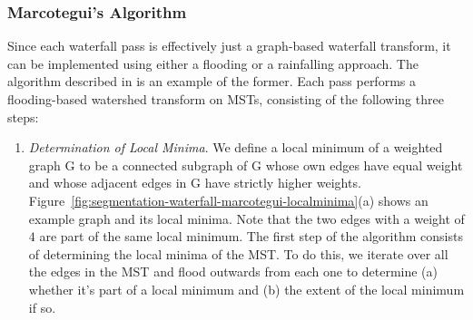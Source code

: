 \subsubsection{Marcotegui's Algorithm}

Since each waterfall pass is effectively just a graph-based waterfall transform, it can be implemented using either a flooding or a rainfalling approach. The algorithm described in \cite{marcotegui05} is an example of the former. Each pass performs a flooding-based watershed transform on MSTs, consisting of the following three steps:

\begin{enumerate}

\item \emph{Determination of Local Minima}. We define a local minimum of a weighted graph G to be a connected subgraph of G whose own edges have equal weight and whose adjacent edges in G have strictly higher weights. Figure~\ref{fig:segmentation-waterfall-marcotegui-localminima}(a) shows an example graph and its local minima. Note that the two edges with a weight of $4$ are part of the same local minimum. The first step of the algorithm consists of determining the local minima of the MST. To do this, we iterate over all the edges in the MST and flood outwards from each one to determine (a) whether it's part of a local minimum and (b) the extent of the local minimum if so.


\end{enumerate}
